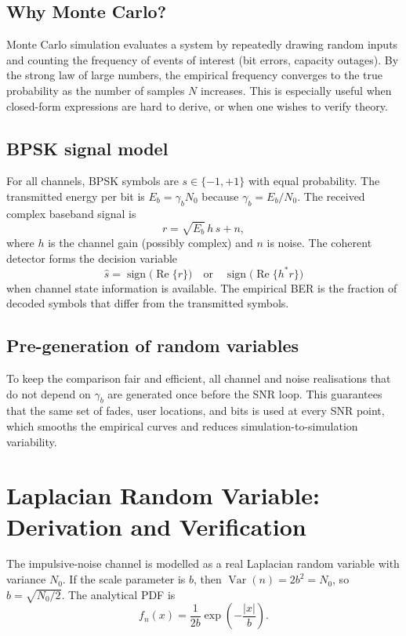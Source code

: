\documentclass[12pt,a4paper]{article}
\begin{document}
\subsection{Why Monte Carlo?}
Monte Carlo simulation evaluates a system by repeatedly drawing random inputs and counting the frequency of events of interest (bit errors, capacity outages). By the strong law of large numbers, the empirical frequency converges to the true probability as the number of samples $N$ increases. This is especially useful when closed-form expressions are hard to derive, or when one wishes to verify theory.

\subsection{BPSK signal model}
For all channels, BPSK symbols are $s\in\{-1,+1\}$ with equal probability. The transmitted energy per bit is $E_b=\gamma_b N_0$ because $\gamma_b=E_b/N_0$. The received complex baseband signal is
\begin{equation}
    r = \sqrt{E_b}\,h\,s + n,
\end{equation}
where $h$ is the channel gain (possibly complex) and $n$ is noise. The coherent detector forms the decision variable
\begin{equation}
    \hat{s} = \operatorname{sign}\bigl(\operatorname{Re}\{r\}\bigr)
    \quad\text{or}\quad
    \operatorname{sign}\bigl(\operatorname{Re}\{h^* r\}\bigr)
\end{equation}
when channel state information is available. The empirical BER is the fraction of decoded symbols that differ from the transmitted symbols.

\subsection{Pre-generation of random variables}
To keep the comparison fair and efficient, all channel and noise realisations that do not depend on $\gamma_b$ are generated once before the SNR loop. This guarantees that the same set of fades, user locations, and bits is used at every SNR point, which smooths the empirical curves and reduces simulation-to-simulation variability.

\section{Laplacian Random Variable: Derivation and Verification}\label{sec:laplace}
The impulsive-noise channel is modelled as a real Laplacian random variable with variance $N_0$. If the scale parameter is $b$, then $\operatorname{Var}(n)=2b^2=N_0$, so $b=\sqrt{N_0/2}$. The analytical PDF is
\begin{equation}
    f_n(x)=\frac{1}{2b}\exp\!\left(-\frac{|x|}{b}\right).
\end{equation}
\end{document}
